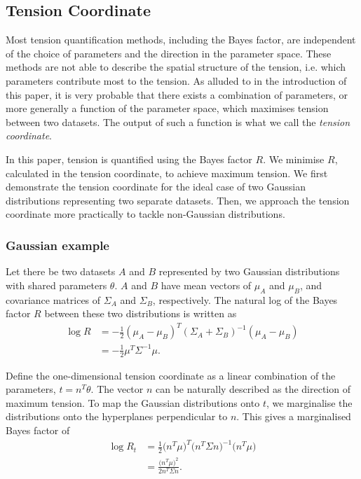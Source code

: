\documentclass[%
 reprint,
 amsmath,amssymb,
 aps,
]{revtex4-2}
\begin{document}
\subsection{Tension Coordinate}

Most tension quantification methods, including the Bayes factor, are independent of the choice of parameters and the direction in the parameter space. These methods are not able to describe the spatial structure of the tension, i.e. which parameters contribute most to the tension. As alluded to in the introduction of this paper, it is very probable that there exists a combination of parameters, or more generally a function of the parameter space, which maximises tension between two datasets. The output of such a function is what we call the \textit{tension coordinate}. 



In this paper, tension is quantified using the Bayes factor $R$. We minimise $R$, calculated in the tension coordinate, to achieve maximum tension. We first demonstrate the tension coordinate for the ideal case of two Gaussian distributions representing two separate datasets. Then, we approach the tension coordinate more practically to tackle non-Gaussian distributions.

\subsubsection{Gaussian example} \label{gaussian_tension}

Let there be two datasets $A$ and $B$ represented by two Gaussian distributions with shared parameters $\theta$. $A$ and $B$ have mean vectors of $\mu_A$ and $\mu_B$, and covariance matrices of $\Sigma_A$ and $\Sigma_B$, respectively. The natural log of the Bayes factor $R$ between these two distributions is written as \cite{Handley2019}
\begin{align}
    \log R &= - \frac{1}{2} (\mu_A - \mu_B)^T (\Sigma_A + \Sigma_B)^{-1} (\mu_A - \mu_B) \\
    &= - \frac{1}{2} \mu^T \Sigma^{-1} \mu.
\end{align}

Define the one-dimensional tension coordinate as a linear combination of the parameters, $t = n^T \theta$. The vector $n$ can be naturally described as the direction of maximum tension. To map the Gaussian distributions onto $t$, we marginalise the distributions onto the hyperplanes perpendicular to $n$. This gives a marginalised Bayes factor of
\begin{align}
    \log R_t &= \frac{1}{2} \big( n^T \mu \big)^T \big( n^T \Sigma n \big)^{-1} \big( n^T \mu \big) \\
    &= \frac{\big( n^T \mu \big)^2}{2 n^T \Sigma n}.
\end{align}
\end{document}
